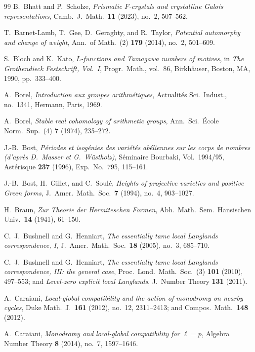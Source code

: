 \begin{thebibliography}{99}
B.~Bhatt and P.~Scholze,
\emph{Prismatic $F$-crystals and crystalline Galois representations},
Camb.\ J.\ Math.\ \textbf{11} (2023), no.~2, 507--562.

T.~Barnet-Lamb, T.~Gee, D.~Geraghty, and R.~Taylor,
\emph{Potential automorphy and change of weight},
Ann.\ of Math.\ (2) \textbf{179} (2014), no.~2, 501--609.

S.~Bloch and K.~Kato,
\emph{$L$-functions and Tamagawa numbers of motives},
in \emph{The Grothendieck Festschrift, Vol.~I}, Progr.\ Math., vol.~86, Birkh\"auser, Boston, MA, 1990, pp.~333--400.

A.~Borel,
\emph{Introduction aux groupes arithm\'etiques},
Actualit\'es Sci.\ Indust., no.~1341, Hermann, Paris, 1969.

A.~Borel,
\emph{Stable real cohomology of arithmetic groups},
Ann.\ Sci.\ \'Ecole Norm.\ Sup.\ (4) \textbf{7} (1974), 235--272.

J.-B.~Bost,
\emph{P\'eriodes et isog\'enies des vari\'et\'es ab\'eliennes sur les corps de nombres (d'apr\`es D.~Masser et G.~W\"ustholz)},
S\'eminaire Bourbaki, Vol.\ 1994/95, Ast\'erisque \textbf{237} (1996), Exp.\ No.~795, 115--161.

J.-B.~Bost, H.~Gillet, and C.~Soul\'e,
\emph{Heights of projective varieties and positive Green forms},
J.\ Amer.\ Math.\ Soc.\ \textbf{7} (1994), no.~4, 903--1027.

H.~Braun,
\emph{Zur Theorie der Hermiteschen Formen},
Abh.\ Math.\ Sem.\ Hansischen Univ.\ \textbf{14} (1941), 61--150.

C.~J.~Bushnell and G.~Henniart,
\emph{The essentially tame local Langlands correspondence, I},
J.\ Amer.\ Math.\ Soc.\ \textbf{18} (2005), no.~3, 685--710.

C.~J.~Bushnell and G.~Henniart,
\emph{The essentially tame local Langlands correspondence, III: the general case},
Proc.\ Lond.\ Math.\ Soc.\ (3) \textbf{101} (2010), 497--553; and \emph{Level-zero explicit local Langlands}, J.\ Number Theory \textbf{131} (2011).

A.~Caraiani,
\emph{Local-global compatibility and the action of monodromy on nearby cycles},
Duke Math.\ J.\ \textbf{161} (2012), no.~12, 2311--2413; and Compos.\ Math.\ \textbf{148} (2012).

A.~Caraiani,
\emph{Monodromy and local-global compatibility for $\ell = p$},
Algebra Number Theory \textbf{8} (2014), no.~7, 1597--1646.


\end{thebibliography}
